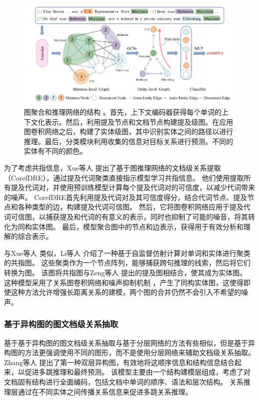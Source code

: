 \documentclass[bachelor]{thesis-uestc}
\begin{document}
\begin{figure}
    \centering
    \includegraphics[width=0.8\linewidth]{misc/GAIN.png}
    \caption{图聚合和推理网络的结构 \cite{GAIN}。首先，上下文编码器获得每个单词的上下文化表示。然后，利用提及节点和文档节点构建提及级图。在应用图卷积网络之后，构建了实体级图，其中识别实体之间的路径以进行推理。最后，分类模块利用收集的信息对目标关系进行预测。不同的实体有不同的颜色。}
\end{figure}\label{fig:GAIN}

为了考虑共指信息，Xue等人 \cite{y2020-coreferential}提出了基于图推理网络的文档级关系提取（CorefDRE），通过提及代词聚类直接指示模型学习共指信息。
他们使用提取所有提及代词对，并使用预训练模型计算每个提及代词对的可信度，以减少代词带来的噪声。
CorefDRE首先利用提及代词对及其可信度得分，结合代词节点、提及节点和各种类型的边，构建提及代词可信图。
然后，它将图卷积网络应用于提及代词可信图，以捕获提及和代词的有意义的表示，同时也抑制了可能的噪音，将其转化为同构实体图。
最后，模型聚合图中的节点和边表示，获得用于有效分析和理解的综合表示。\par

与Xue等人 \cite{y2020-coreferential}类似，Li等人 \cite{LI2022109146}介绍了一种基于自监督仿射计算对单词和实体进行聚类的共指图。
这些聚类作为一个节点阵列，能够捕获跨句推理的线索，然后将它们转换为图。
该图将共指图与Zeng等人 \cite{GAIN}提出的提及图相结合，使其成为实体图。
这种模型采用了关系图卷积网络和噪声抑制机制 \cite{y2020-coreferential}，产生了同构实体图，这使得即使这种方法允许增强长距离关系的建模，两个图的合并仍然不会引入不希望的噪声。\par

\subsubsection{基于异构图的图文档级关系抽取}\label{subsec:heterogeneous-graph}
基于基于异构图的图文档级关系抽取与基于分层网络的方法有些相似，但是基于异构图的方法更强调使用不同的图形，而不是使用分层网络来辅助文档级关系抽取。
Zhang等人 \cite{zhang-etal-2020-document}提出了第一种双层异构图，有效地将这顺序信息和结构信息结合起来，以促进多跳推理和最终预测。
该模型主要由一个结构建模层组成，考虑了对文档固有结构进行全面编码，包括文档中单词的顺序、语法和层次结构。
关系推理层通过在不同实体之间传播关系信息来促进多跳关系推理。\par
\end{document}
